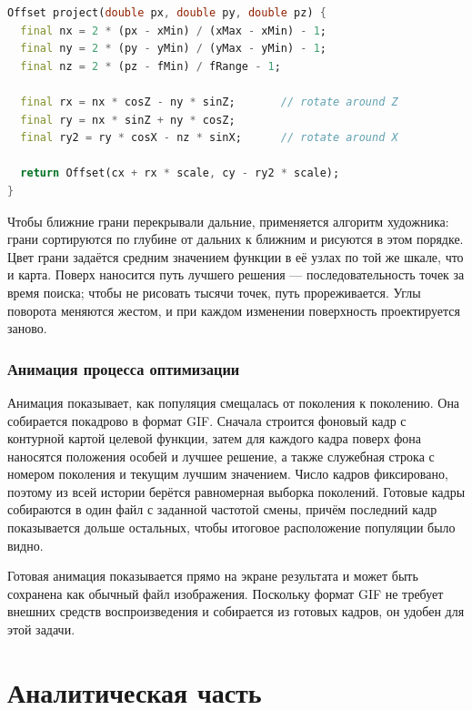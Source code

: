 \documentclass[14pt, a4paper]{extarticle}
\begin{document}
\begin{lstlisting}[language=Dart, caption={Проекция точки поверхности на экран}, label={lst:project}]
Offset project(double px, double py, double pz) {
  final nx = 2 * (px - xMin) / (xMax - xMin) - 1;
  final ny = 2 * (py - yMin) / (yMax - yMin) - 1;
  final nz = 2 * (pz - fMin) / fRange - 1;

  final rx = nx * cosZ - ny * sinZ;       // rotate around Z
  final ry = nx * sinZ + ny * cosZ;
  final ry2 = ry * cosX - nz * sinX;      // rotate around X

  return Offset(cx + rx * scale, cy - ry2 * scale);
}
\end{lstlisting}

Чтобы ближние грани перекрывали дальние, применяется алгоритм художника: грани
сортируются по глубине от дальних к ближним и рисуются в этом порядке. Цвет грани
задаётся средним значением функции в её узлах по той же шкале, что и карта. Поверх
наносится путь лучшего решения --- последовательность точек за время поиска;
чтобы не рисовать тысячи точек, путь прореживается. Углы поворота меняются жестом, и
при каждом изменении поверхность проектируется заново.

\subsubsection{Анимация процесса оптимизации}

Анимация показывает, как популяция смещалась от поколения к поколению. Она
собирается покадрово в формат GIF. Сначала строится фоновый кадр с контурной картой
целевой функции, затем для каждого кадра поверх фона наносятся положения особей и
лучшее решение, а также служебная строка с номером поколения и текущим лучшим
значением. Число кадров фиксировано, поэтому из всей истории берётся равномерная
выборка поколений. Готовые кадры собираются в один файл с заданной частотой смены,
причём последний кадр показывается дольше остальных, чтобы итоговое расположение
популяции было видно.

Готовая анимация показывается прямо на экране результата и может быть сохранена как
обычный файл изображения. Поскольку формат GIF не требует внешних средств
воспроизведения и собирается из готовых кадров, он удобен для этой задачи.
\label{subsec:visualization}

\section{Аналитическая часть}\label{sec:analysis}
\end{document}
